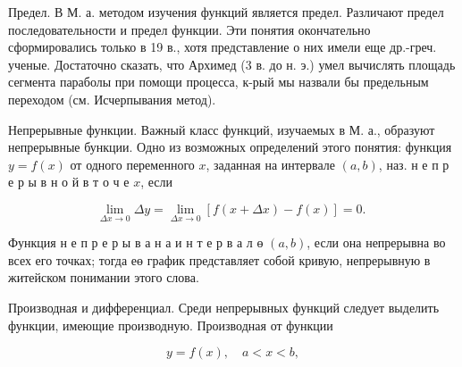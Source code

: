 \documentclass[10pt]{article}
\begin{document}
Предел. В М. а. методом изучения функций является предел. Различают предел последовательности и предел функции. Эти понятия окончательно сформировались только в 19 в., хотя представление о них имели еще др.-греч. ученые. Достаточно сказать, что Архимед (3 в. до н. э.) умел вычислять площадь сегмента параболы при помощи процесса, к-рый мы назвали бы предельным переходом (см. Исчерпывания метод).



Непрерывные функции. Важный класс функций, изучаемых в М. а., образуют непрерывные бункции. Одно из возможных определений этого понятия: функция $y=f(x)$ от одного переменного $x$, заданная на интервале $(a, b)$, наз. н е п р е р ы в н о й в т о ч е $x$, если



\[

\lim _{\Delta x \rightarrow 0} \Delta y=\lim _{\Delta x \rightarrow 0}[f(x+\Delta x)-f(x)]=0 \text {. }

\]



Функция н е п р е р ы в а н а и н т е р в а л $ө$ $(a, b)$, если она непрерывна во всех его точках; тогда еө график представляет собой кривую, непрерывную в житейском понимании этого слова.



Производная и дифференциал. Среди непрерывных функций следует выделить функции, имеющие производную. Производная от функции



\[

y=f(x), \quad a<x<b,

\]
\end{document}
